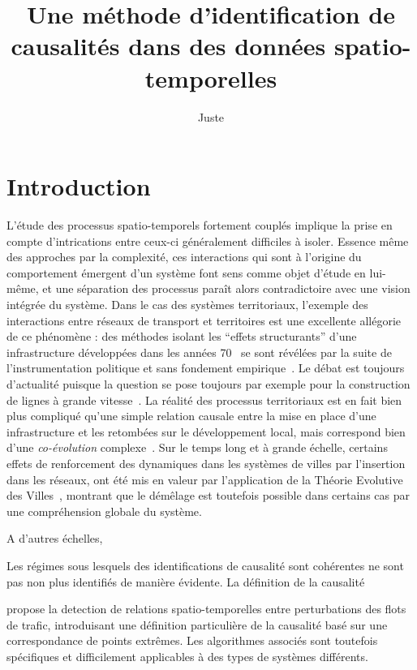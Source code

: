 \documentclass[french]{./sageo}
\title[Causalités Spatio-temporelles]{Une méthode d'identification de causalités dans des données spatio-temporelles}
\author[1,2]{Juste}{Raimbault}
\begin{document}
\maketitle

\newpage



\section{Introduction}



L'étude des processus spatio-temporels fortement couplés implique la prise en compte d'intrications entre ceux-ci généralement difficiles à isoler. Essence même des approches par la complexité, ces interactions qui sont à l'origine du comportement émergent d'un système font sens comme objet d'étude en lui-même, et une séparation des processus paraît alors contradictoire avec une vision intégrée du système. Dans le cas des systèmes territoriaux, l'exemple des interactions entre réseaux de transport et territoires est une excellente allégorie de ce phénomène : des méthodes isolant les ``effets structurants'' d'une infrastructure développées dans les années 70~\cite{bonnafous1974methodologies} se sont révélées par la suite de l'instrumentation politique et sans fondement empirique~\cite{offner1993effets}. Le débat est toujours d'actualité puisque la question se pose toujours par exemple pour la construction de lignes à grande vitesse~\cite{crozethalshs01094554}. La réalité des processus territoriaux est en fait bien plus compliqué qu'une simple relation causale entre la mise en place d'une infrastructure et les retombées sur le développement local, mais correspond bien d'une \emph{co-évolution} complexe~\cite{bretagnolletel00459720}. Sur le temps long et à grande échelle, certains effets de renforcement des dynamiques dans les systèmes de villes par l'insertion dans les réseaux, ont été mis en valeur par l'application de la Théorie Evolutive des Villes~\cite{espacegeo2014effets}, montrant que le démêlage est toutefois possible dans certains cas par une compréhension globale du système.

A d'autres échelles, %

Les régimes sous lesquels des identifications de causalité sont cohérentes ne sont pas non plus identifiés de manière évidente. La définition de la causalité


\cite{liu2011discovering} propose la detection de relations spatio-temporelles entre perturbations des flots de trafic, introduisant une définition particulière de la causalité basé sur une correspondance de points extrêmes. Les algorithmes associés sont toutefois spécifiques et difficilement applicables à des types de systèmes différents.
\end{document}
